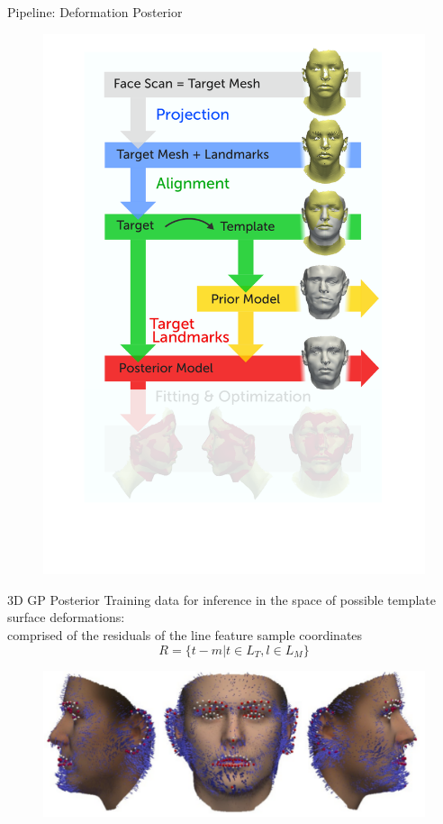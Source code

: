 \documentclass[xcolor=x11names,compress]{beamer}
\begin{document}
\begin{frame}{Pipeline: Deformation Posterior}
\begin{figure}   
\centering
\includegraphics[width=.6\textwidth]{../resources/figures/pipeline_posterior.pdf}
\end{figure}
\end{frame}

\begin{frame}{3D GP Posterior}
Training data for inference in the space of possible template surface deformations:\\
comprised of the residuals of the line feature sample coordinates        
\begin{equation*}
R = \{t - m \vert t \in L_{T}, l \in L_{M}\} 
\end{equation*}
\begin{figure}   
\centering
\includegraphics[width=.6\textwidth]{../resources/img/posterior_deformations.pdf}
\end{figure}

\end{frame}
\end{document}
